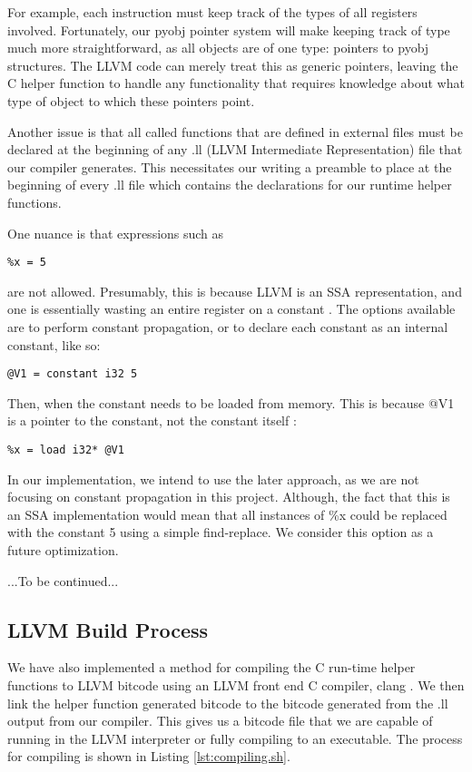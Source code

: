 \documentclass[11pt,twocolumn]{article}
\begin{document}
For example, each instruction must keep track of the types of all
registers involved. Fortunately, our pyobj pointer system will make
keeping track of type much more straightforward, as all objects are of
one type: pointers to pyobj structures. The LLVM code can merely treat
this as generic pointers, leaving the C helper function to handle any
functionality that requires knowledge about what type of object to
which these pointers point.

Another issue is that all called functions that are defined in
external files must be declared at the beginning of any .ll (LLVM
Intermediate Representation) file that our compiler generates. This
necessitates our writing a preamble to place at the beginning of every
.ll file which contains the declarations for our runtime helper
functions.

One nuance is that expressions such as
\begin{verbatim}
%x = 5
\end{verbatim} 
are not allowed. Presumably, this is because LLVM is an SSA
representation, and one is essentially wasting an entire register on a
constant \cite{llvm-discussions}. The options available are to perform
constant propagation, or to declare each constant as an internal
constant, like so:
\begin{verbatim}
@V1 = constant i32 5
\end{verbatim}
Then, when the constant needs to be loaded from memory. This is
because @V1 is a pointer to the constant, not the constant itself
\cite{Regni}:
\begin{verbatim}
%x = load i32* @V1
\end{verbatim}

In our implementation, we intend to use the later approach, as we are
not focusing on constant propagation in this project. Although, the
fact that this is an SSA implementation would mean that all instances
of \%x could be replaced with the constant 5 using a simple
find-replace. We consider this option as a future optimization.

...To be continued...

\subsection{LLVM Build Process}

We have also implemented a method for compiling the C run-time helper
functions to LLVM bitcode using an LLVM front end C compiler, clang
\cite{clang.llvm.org}. We then link the helper function generated
bitcode to the bitcode generated from the .ll output from our
compiler. This gives us a bitcode file that we are capable of running
in the LLVM interpreter or fully compiling to an executable.  The
process for compiling is shown in Listing \ref{lst:compiling.sh}.
\end{document}
